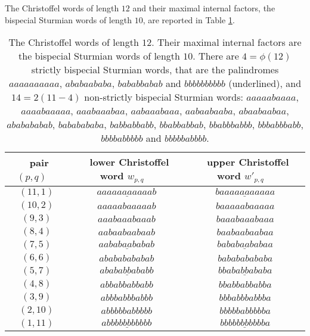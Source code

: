 \documentclass{llncs}
\begin{document}
\begin{example}
The Christoffel words of length $12$ and their maximal internal factors, the bispecial Sturmian words of length $10$, are reported in Table \ref{tab:example}. 

\begin{table}[h]
\begin{center}
  \begin{tabular}{|c | c | c | }
  
\ pair $(p,q)$ \ & \ lower Christoffel word $w_{p,q}$ \ & \ upper Christoffel word $w'_{p,q}$ \  \\    \hline 
 $(11,1)$ &    $a\underline{aaaaaaaaaa}b$   & $b\underline{aaaaaaaaaa}a$        \\
 $(10,2)$ &    $aaaaabaaaaab$   & $baaaaabaaaaa  $      \\
 $(9,3)$  &    $aaabaaabaaab$   & $baaabaaabaaa $       \\
 $(8,4)$  &    $aabaabaabaab$   & $baabaabaabaa $       \\
 $(7,5)$  &    $a\underline{ababaababa}b$   & $b\underline{ababaababa}a $       \\
 $(6,6)$  &    $abababababab$   & $babababababa $    \\
 $(5,7)$  &    $a\underline{bababbabab}b$   & $b\underline{bababbabab}a $       \\
 $(4,8)$  &    $abbabbabbabb$   & $bbabbabbabba  $      \\
 $(3,9)$  &    $abbbabbbabbb$   & $bbbabbbabbba $       \\
 $(2,10)$ &    $abbbbbabbbbb$   & $bbbbbabbbbba $       \\
 $(1,11)$ &    $a\underline{bbbbbbbbbb}b$   & $b\underline{bbbbbbbbbb}a $       \\    
 \hline 
  \end{tabular}\vspace{4mm}
\end{center}\caption{The Christoffel words of length $12$. Their maximal internal factors are the bispecial Sturmian words of length $10$. There are $4=\phi(12)$ strictly bispecial Sturmian words, that are the palindromes $aaaaaaaaaa$, $ababaababa$, $bababbabab$ and $bbbbbbbbbb$ (underlined), and $14=2(11-4)$ non-strictly bispecial Sturmian words: $aaaaabaaaa$, $aaaabaaaaa$, $aaabaaabaa$, $aabaaabaaa$, $aabaabaaba$, $abaabaabaa$, $ababababab$, $bababababa$, $babbabbabb$, $bbabbabbab$, $bbabbbabbb$, $bbbabbbabb$, $bbbbabbbbb$ and  $bbbbbabbbb$.\label{tab:example}}
\end{table}
\end{example}
\end{document}

